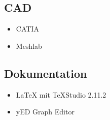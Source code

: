 \subsection*{CAD}\label{catia}
\begin{itemize}
	\item CATIA
	\item Meshlab
\end{itemize}

\subsection*{Dokumentation}\label{dokutools}
\begin{itemize}
	\item \LaTeX{} mit TeXStudio 2.11.2
	\item yED Graph Editor
\end{itemize}

